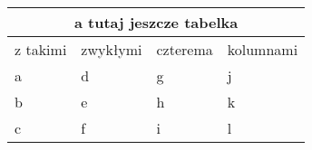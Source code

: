 \centering
\noindent\begin{tabular}
{ |p{2cm}|p{2cm}|p{2cm}|p{2cm}|  }
 \hline
 \multicolumn{4}{|c|}{a tutaj jeszcze tabelka} \\
 \hline
 z takimi & zwykłymi & czterema & kolumnami \\
 \hline
 a & d & g & j\\
 b & e & h & k\\
 c & f & i & l\\
 \hline
\end{tabular}